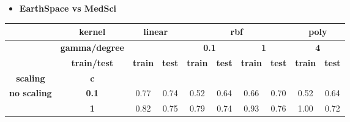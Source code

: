 \documentclass{article}
\theoremstyle{mytheoremstyle}
\theoremstyle{mytheoremstyle}
\theoremstyle{myproblemstyle}
\begin{document}
\begin{itemize}
  \item \textbf{EarthSpace vs MedSci}
\end{itemize}
\begin{longtable}{cccc|cccc|cc}
  \cline{2-10}
  \textbf{}                                                                            & \textbf{kernel}       & \multicolumn{2}{c|}{\textbf{linear}} & \multicolumn{4}{c|}{\textbf{rbf}} & \multicolumn{2}{c}{\textbf{poly}}                                                                                                    \\ \cline{2-10}
  \endfirsthead
  \endhead
  \textbf{}                                                                            & \textbf{gamma/degree} & \multicolumn{2}{c|}{\textbf{}}       & \multicolumn{2}{c}{\textbf{0.1}}  & \multicolumn{2}{c|}{\textbf{1}}   & \multicolumn{2}{c}{\textbf{4}}                                                                   \\ \cline{2-10}
  \textbf{}                                                                            & \textbf{train/test}   & \textbf{train}                       & \textbf{test}                     & \textbf{train}                    & \textbf{test}                  & \textbf{train} & \textbf{test} & \textbf{train} & \textbf{test} \\ \cline{2-10}
  \textbf{scaling}                                                                     & \textbf{c}            & \textbf{}                            & \textbf{}                         & \textbf{}                         & \textbf{}                      & \textbf{}      & \textbf{}     & \textbf{}      & \textbf{}     \\ \hline
  \multirow{3}{*}{\textbf{no scaling}}                                                 & \textbf{0.1}          & 0.77                                 & 0.74                              & 0.52                              & 0.64                           & 0.66           & 0.70          & 0.52           & 0.64          \\ \cline{7-8}
                                                                                       & \textbf{1}            & 0.82                                 & 0.75                              & 0.79                              & \multicolumn{1}{c|}{0.74}      & 0.93           & 0.76          & 1.00           & 0.72          \\ \cline{7-8}

\end{longtable}
\end{document}
